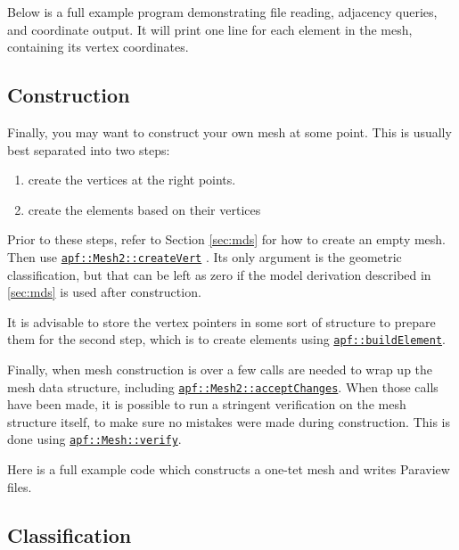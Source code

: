 \documentclass{article}
\begin{document}
Below is a full example program demonstrating file reading,
adjacency queries, and coordinate output.
It will print one line for each element in the mesh,
containing its vertex coordinates.



\subsection{Construction}
\label{sec:gen}

Finally, you may want to construct your own mesh at
some point.
This is usually best separated into two steps:
\begin{enumerate}
\item create the vertices at the right points.
\item create the elements based on their vertices
\end{enumerate}

Prior to these steps, refer to Section \ref{sec:mds} for
how to create an empty mesh.
Then use
\href{http://scorec.rpi.edu/~dibanez/core/classapf_1_1Mesh2.html#ae7a58e9d51c9a683506d83e69416482d}{\texttt{apf::Mesh2::createVert}}
.
Its only argument is the geometric classification, but
that can be left as zero if the model derivation described
in \ref{sec:mds} is used after construction.

It is advisable to store the vertex pointers in some sort
of structure to prepare them for the second step,
which is to create elements using
\href{http://scorec.rpi.edu/~dibanez/core/namespaceapf.html#ae4a6608901d851a5d760bef899ca8e4a}{\texttt{apf::buildElement}}.

Finally, when mesh construction is over a few calls are
needed to wrap up the mesh data structure, including
\href{http://scorec.rpi.edu/~dibanez/core/classapf_1_1Mesh2.html#a87d3e1594f409859553bc285686009b4}{\texttt{apf::Mesh2::acceptChanges}}.
When those calls have been made, it is possible to run
a stringent verification on the mesh structure itself,
to make sure no mistakes were made during construction.
This is done using
\href{http://scorec.rpi.edu/~dibanez/core/classapf_1_1Mesh.html#a581c9102d05ed9399242e77e9fa96839}{\texttt{apf::Mesh::verify}}.

Here is a full example code which constructs a one-tet
mesh and writes Paraview files.



\subsection{Classification}
\end{document}
